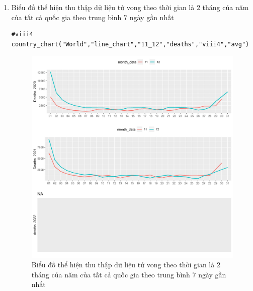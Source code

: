 \documentclass[a4paper]{article}
\theoremstyle{definition}
\begin{document}
\begin{enumerate}[i)]
\begin{enumerate}[1)]
    \item Biểu đồ thể hiện thu thập dữ liệu tử vong theo thời gian là 2 tháng của năm của tất cả quốc gia theo trung bình 7 ngày gần nhất
    \begin{lstlisting}
#viii4
country_chart("World","line_chart","11_12","deaths","viii4","avg")   
    \end{lstlisting}
    \begin{figure}[htp]
        \centering
		\includegraphics[scale = 0.7]{Images/VIII/viii4 World .jpeg} 
		\caption{Biểu đồ thể hiện thu thập dữ liệu tử vong theo thời gian là 2 tháng của năm của tất cả quốc gia theo trung bình 7 ngày gần nhất}
		\label{fig:my_label}
	\end{figure}
	\newpage
	

\end{enumerate}
\end{enumerate}
\end{document}

